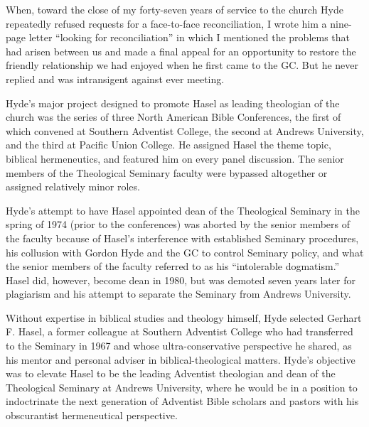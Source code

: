 When, toward the close of my forty-seven years of service to the church Hyde
repeatedly refused requests for a face-to-face reconciliation, I wrote him a
nine-page letter ``looking for reconciliation'' in which I mentioned the
problems that had arisen between us and made a final appeal for an
opportunity to restore the friendly relationship we had enjoyed when he
first came to the GC. But he never replied and was intransigent against ever
meeting.

Hyde's major project designed to promote Hasel as leading theologian of the
church was the series of three North American Bible Conferences, the first
of which convened at Southern Adventist College, the second at Andrews
University, and the third at Pacific Union College. He assigned Hasel the 
theme topic, biblical hermeneutics, and featured him on every panel
discussion. The senior members of the Theological Seminary faculty were
bypassed altogether or assigned relatively minor 
roles.

Hyde's attempt to have Hasel appointed dean of the Theological Seminary in
the spring of 1974 (prior to the conferences) was aborted by the senior
members of the faculty because of Hasel's interference with established
Seminary procedures, his collusion with Gordon Hyde and the GC to control
Seminary policy, and what the senior members of the faculty referred to as
his ``intolerable
dogmatism.'' Hasel did, however, become dean in 1980, but
was demoted seven years later for plagiarism and his attempt to separate the
Seminary from Andrews University.

Without expertise in biblical studies and theology himself, Hyde selected
Gerhart F. Hasel, a former colleague at Southern Adventist College who had
transferred to the Seminary in 1967 and whose ultra-conservative perspective
he shared, as his mentor and personal adviser in biblical-theological
matters. Hyde's objective was to elevate Hasel to be the leading Adventist
theologian and dean of the Theological Seminary at Andrews University, where
he would be in a position to indoctrinate the next generation of Adventist
Bible scholars and pastors with his obscurantist hermeneutical perspective.

